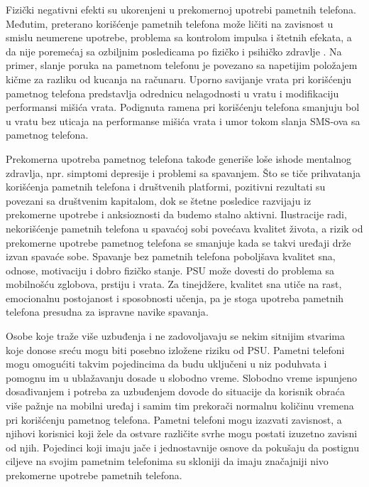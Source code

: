 \documentclass[a4paper]{article}
\begin{document}
Fizički negativni efekti su ukorenjeni u prekomernoj upotrebi
pametnih telefona\cite{consume}. Međutim, preterano korišćenje pametnih telefona
može ličiti na zavisnost u smislu neumerene upotrebe,
problema sa kontrolom impulsa i štetnih efekata,
a da nije poremećaj sa ozbiljnim posledicama po fizičko
i psihičko zdravlje \cite{addiction}. Na primer, slanje poruka na
pametnom telefonu je povezano sa napetijim
položajem kičme za razliku od kucanja na računaru.
Uporno savijanje vrata pri korišćenju pametnog telefona predstavlja odrednicu
nelagodnosti u vratu i modifikaciju performansi mišića vrata.
Podignuta ramena pri korišćenju telefona smanjuju bol u vratu bez uticaja na performanse
mišića vrata i umor tokom slanja SMS-ova sa pametnog telefona\cite{addiction}.


Prekomerna upotreba pametnog telefona takođe generiše loše ishode mentalnog
zdravlja, npr. simptomi depresije i problemi sa spavanjem.
Što se tiče prihvatanja korišćenja pametnih telefona i društvenih platformi,
pozitivni rezultati su povezani sa društvenim kapitalom\cite{consume},
dok se štetne posledice razvijaju iz prekomerne upotrebe 
i anksioznosti da budemo stalno aktivni.
Ilustracije radi, nekorišćenje pametnih telefona u spavaćoj sobi
povećava kvalitet života, a rizik od prekomerne upotrebe pametnog
telefona se smanjuje kada se takvi uređaji drže izvan spavaće sobe.
Spavanje bez pametnih telefona poboljšava kvalitet sna, odnose, motivaciju
i dobro fizičko stanje.
PSU može dovesti do problema sa mobilnošću zglobova, prstiju i vrata.
Za tinejdžere, kvalitet sna utiče na rast,
emocionalnu postojanost i sposobnosti učenja, pa je stoga upotreba
pametnih telefona presudna za ispravne navike spavanja\cite{consume}.


Osobe koje traže više uzbuđenja i ne zadovoljavaju se nekim sitnijim stvarima 
koje donose sreću mogu biti posebno izložene riziku od PSU.
Pametni telefoni mogu omogućiti takvim pojedincima da budu uključeni u niz poduhvata
i pomognu im u ublažavanju dosade u slobodno vreme.
Slobodno vreme ispunjeno dosađivanjem i potreba za uzbuđenjem\cite{ethics}
dovode do situacije da korisnik obraća više pažnje
na mobilni uređaj i samim tim prekorači normalnu količinu vremena pri
korišćenju pametnog telefona.
Pametni telefoni mogu izazvati zavisnost,
a njihovi korisnici koji žele da ostvare različite svrhe mogu postati
izuzetno zavisni od njih.
Pojedinci koji imaju jače i jednostavnije osnove da pokušaju da postignu ciljeve
na svojim pametnim telefonima su skloniji da imaju značajniji
nivo prekomerne upotrebe pametnih telefona\cite{factors}.
\end{document}

